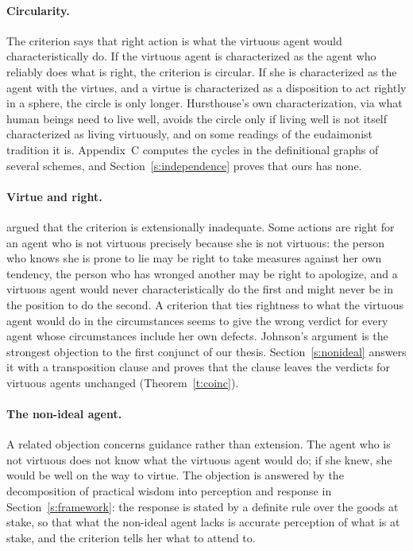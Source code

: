 \documentclass{situationist-preprint}
\begin{document}
\paragraph{Circularity.} The criterion says that right action is what the virtuous agent would characteristically do. If the virtuous agent is characterized as the agent who reliably does what is right, the criterion is circular. If she is characterized as the agent with the virtues, and a virtue is characterized as a disposition to act rightly in a sphere, the circle is only longer. Hursthouse's own characterization, via what human beings need to live well, avoids the circle only if living well is not itself characterized as living virtuously, and on some readings of the eudaimonist tradition it is. Appendix~C computes the cycles in the definitional graphs of several schemes, and Section~\ref{s:independence} proves that ours has none.

\paragraph{Virtue and right.} \citet{Johnson2003} argued that the criterion is extensionally inadequate. Some actions are right for an agent who is not virtuous precisely because she is not virtuous: the person who knows she is prone to lie may be right to take measures against her own tendency, the person who has wronged another may be right to apologize, and a virtuous agent would never characteristically do the first and might never be in the position to do the second. A criterion that ties rightness to what the virtuous agent would do in the circumstances seems to give the wrong verdict for every agent whose circumstances include her own defects. Johnson's argument is the strongest objection to the first conjunct of our thesis. Section~\ref{s:nonideal} answers it with a transposition clause and proves that the clause leaves the verdicts for virtuous agents unchanged (Theorem~\ref{t:coinc}).

\paragraph{The non-ideal agent.} A related objection concerns guidance rather than extension. The agent who is not virtuous does not know what the virtuous agent would do; if she knew, she would be well on the way to virtue. The objection is answered by the decomposition of practical wisdom into perception and response in Section~\ref{s:framework}: the response is stated by a definite rule over the goods at stake, so that what the non-ideal agent lacks is accurate perception of what is at stake, and the criterion tells her what to attend to.
\end{document}
